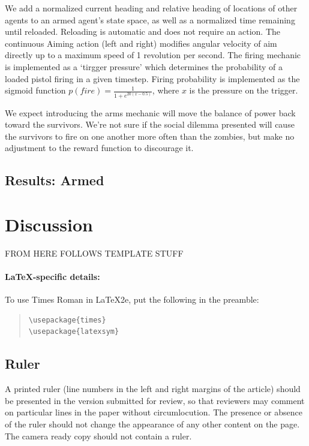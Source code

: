 \documentclass[11pt,a4paper]{article}
\begin{document}
We add a normalized current heading and relative heading of locations of other agents to an armed agent's state space, as well as a normalized time remaining until reloaded.
Reloading is automatic and does not require an action.
The continuous Aiming action (left and right) modifies angular velocity of aim directly up to a maximum speed of 1 revolution per second.
The firing mechanic is implemented as a `tirgger pressure' which determines the probability of a loaded pistol firing in a given timestep.
Firing probability is implemented as the sigmoid function $p(fire) = \frac{1}{1+e^{20(x-0.5)}}$, where $x$ is the pressure on the trigger.

We expect introducing the arms mechanic will move the balance of power back toward the survivors.
We're not sure if the social dilemma presented will cause the survivors to fire on one another more often than the zombies,
but make no adjustment to the reward function to discourage it.

\subsection{Results: Armed}

\section{Discussion}
\label{sec:discussion}

FROM HERE FOLLOWS TEMPLATE STUFF


\paragraph{\LaTeX-specific details:}
To use Times Roman in \LaTeX2e{}, put the following in the preamble:
\begin{quote}
\small
\begin{verbatim}
\usepackage{times}
\usepackage{latexsym}
\end{verbatim}
\end{quote}


\subsection{Ruler}
A printed ruler (line numbers in the left and right margins of the article) should be presented in the version submitted for review, so that reviewers may comment on particular lines in the paper without circumlocution.
The presence or absence of the ruler should not change the appearance of any other content on the page.
The camera ready copy should not contain a ruler.
\end{document}
